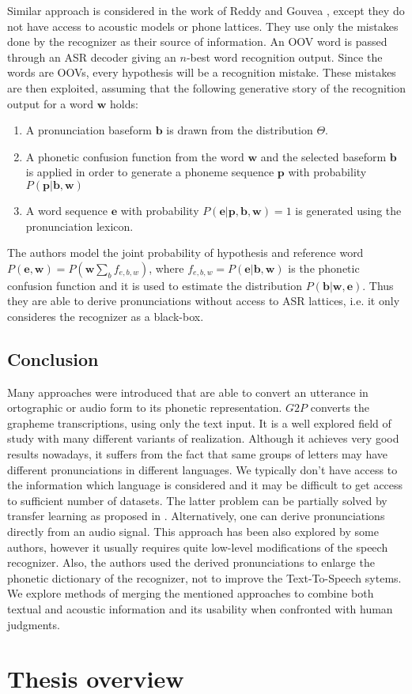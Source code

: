 Similar approach is considered in the work of Reddy and Gouvea \cite{reddy2011learning}, except they do not have access to acoustic models or phone lattices.
They use only the mistakes done by the recognizer as their source of information.
An OOV word is passed through an ASR decoder giving an $n$-best word recognition output.
Since the words are OOVs, every hypothesis will be a recognition mistake.
These mistakes are then exploited, assuming that the following generative story of the recognition output
for a word $\mathbf{w}$ holds:
\begin{enumerate}
\item A pronunciation baseform $\mathbf{b}$ is drawn from the distribution $\Theta$.
\item A phonetic confusion function from the word $\mathbf{w}$ and the selected baseform $\mathbf{b}$ is applied in order to generate a phoneme sequence $\mathbf{p}$ with probability $P(\mathbf{p}|\mathbf{b},\mathbf{w})$
\item A word sequence $\mathbf{e}$ with probability $P (\mathbf{e} \vert \mathbf{p},\mathbf{b},\mathbf{w}) = 1$ 
is generated using the pronunciation lexicon.
\end{enumerate}
The authors model the joint probability of hypothesis and reference word $P(\mathbf{e}, \mathbf{w}) = P(\mathbf{w}\sum_b f_{e,b,w})$, where $f_{e,b,w} = P(\mathbf{e}\vert \mathbf{b}, \mathbf{w})$ is the phonetic confusion function and it is used to estimate the distribution $P(\mathbf{b}\vert\mathbf{w},\mathbf{e})$.
Thus they are able to derive pronunciations without access to ASR lattices, i.e. it only consideres the recognizer as a black-box. 
\subsection{Conclusion}
Many approaches were introduced that are able to convert an utterance in ortographic or audio form to its phonetic representation.
$G2P$ converts the grapheme transcriptions, using only the text input.
It is a well explored field of study with many different variants of realization.
Although it achieves very good results nowadays, it suffers from the fact that same groups of letters may have different pronunciations in different languages.
We typically don't have access to the information which language is considered and it may be difficult to get access to sufficient number of datasets.
The latter problem can be partially solved by transfer learning as proposed in \cite{deri2016grapheme}.
\linebreak\linebreak
Alternatively, one can derive pronunciations directly from an audio signal.
This approach has been also explored by some authors, however it usually requires quite low-level modifications of the speech recognizer.
Also, the authors used the derived pronunciations to enlarge the phonetic dictionary of the recognizer, not to improve the Text-To-Speech sytems.
We explore methods of merging the mentioned approaches to combine both textual and acoustic information and its usability when confronted with human judgments.
\section{Thesis overview}